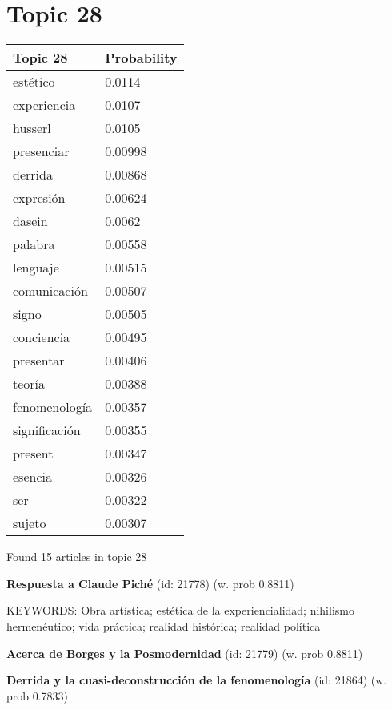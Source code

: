 \documentclass{article}
\begin{document}
\vfill
\newpage


\centering
\thispagestyle{empty}
\section*{Topic 28}\vfill
\begin{tabular}{ll}
\toprule
      Topic 28 & Probability \\
\midrule
      estético &      0.0114 \\
   experiencia &      0.0107 \\
       husserl &      0.0105 \\
    presenciar &     0.00998 \\
       derrida &     0.00868 \\
     expresión &     0.00624 \\
        dasein &      0.0062 \\
       palabra &     0.00558 \\
      lenguaje &     0.00515 \\
  comunicación &     0.00507 \\
         signo &     0.00505 \\
    conciencia &     0.00495 \\
     presentar &     0.00406 \\
        teoría &     0.00388 \\
 fenomenología &     0.00357 \\
 significación &     0.00355 \\
       present &     0.00347 \\
       esencia &     0.00326 \\
           ser &     0.00322 \\
        sujeto &     0.00307 \\
\bottomrule
\end{tabular}

\vfill
Found 15 articles in topic 28
\vfill

\textbf{Respuesta a Claude Piché} (id: 21778)
 (w. prob 0.8811)


KEYWORDS:
Obra artística; estética de la experiencialidad; nihilismo hermenéutico; vida práctica; realidad histórica; realidad política
\vfill

\textbf{Acerca de Borges y la Posmodernidad} (id: 21779)
 (w. prob 0.8811)
\vfill

\textbf{Derrida y la cuasi-deconstrucción de la fenomenología} (id: 21864)
 (w. prob 0.7833)
\end{document}
